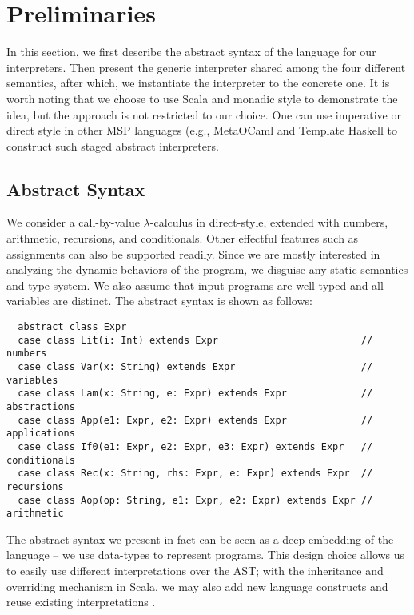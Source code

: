 \newcommand{\TLang}{$L_\lambda$}

\section{Preliminaries} \label{prelim}

In this section, we first describe the abstract syntax of the language for our interpreters. 
Then present the generic interpreter shared among the four different
semantics, after which, we instantiate the interpreter to the concrete one.
It is worth noting that we choose to use Scala and monadic style to
demonstrate the idea, but the approach is not restricted to our
choice. One can use imperative or direct style in other MSP languages
(e.g., MetaOCaml \cite{DBLP:conf/gpce/CalcagnoTHL03, DBLP:conf/flops/Kiselyov14}
and Template Haskell \cite{Sheard:2002:TMH:636517.636528} to construct
such staged abstract interpreters.

\subsection{Abstract Syntax} \label{bg_lang}

We consider a call-by-value $\lambda$-calculus in direct-style, extended
with numbers, arithmetic, recursions, and conditionals. Other effectful features
such as assignments can also be supported readily.
Since we are mostly interested in analyzing the dynamic behaviors of the
program, we disguise any static semantics and type system. We also assume that
input programs are well-typed and all variables are distinct. The abstract
syntax is shown as follows:

\begin{lstlisting}
  abstract class Expr
  case class Lit(i: Int) extends Expr                         // numbers
  case class Var(x: String) extends Expr                      // variables
  case class Lam(x: String, e: Expr) extends Expr             // abstractions
  case class App(e1: Expr, e2: Expr) extends Expr             // applications
  case class If0(e1: Expr, e2: Expr, e3: Expr) extends Expr   // conditionals
  case class Rec(x: String, rhs: Expr, e: Expr) extends Expr  // recursions
  case class Aop(op: String, e1: Expr, e2: Expr) extends Expr // arithmetic
\end{lstlisting}

The abstract syntax we present in fact can be seen as a deep embedding of the
language -- we use data-types to represent programs. This design choice allows us
to easily use different interpretations over the AST; with the inheritance and
overriding mechanism in Scala, we may also add new language constructs and reuse
existing interpretations .

